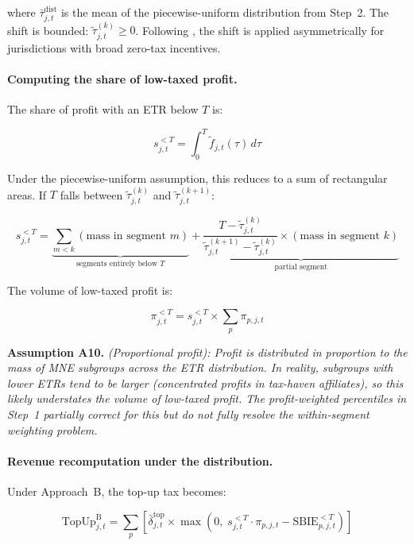 \documentclass[11pt,a4paper]{article}
\newcommand{\assumption}[2]{\noindent\textbf{Assumption #1.} \textit{#2}\medskip}
\begin{document}
where $\bar{\tau}_{j,t}^{\text{dist}}$ is the mean of the piecewise-uniform distribution from Step~2. The shift is bounded: $\tilde{\tau}_{j,t}^{(k)} \geq 0$. Following \citet{hugger2026}, the shift is applied asymmetrically for jurisdictions with broad zero-tax incentives.

\paragraph{Computing the share of low-taxed profit.}
The share of profit with an ETR below $T$ is:

\begin{equation}\label{eq:lowtax_share}
s_{j,t}^{<T} = \int_0^{T} \tilde{f}_{j,t}(\tau) \, d\tau
\end{equation}

Under the piecewise-uniform assumption, this reduces to a sum of rectangular areas. If $T$ falls between $\tilde{\tau}_{j,t}^{(k)}$ and $\tilde{\tau}_{j,t}^{(k+1)}$:

\begin{equation}\label{eq:lowtax_share_pw}
s_{j,t}^{<T} = \underbrace{\sum_{m < k} (\text{mass in segment } m)}_{\text{segments entirely below } T} + \underbrace{\frac{T - \tilde{\tau}_{j,t}^{(k)}}{\tilde{\tau}_{j,t}^{(k+1)} - \tilde{\tau}_{j,t}^{(k)}} \times (\text{mass in segment } k)}_{\text{partial segment}}
\end{equation}

The volume of low-taxed profit is:

\begin{equation}\label{eq:lowtax_profit}
\pi_{j,t}^{<T} = s_{j,t}^{<T} \times \sum_p \pi_{p,j,t}
\end{equation}

\assumption{A10}{(Proportional profit): Profit is distributed in proportion to the mass of MNE subgroups across the ETR distribution. In reality, subgroups with lower ETRs tend to be larger (concentrated profits in tax-haven affiliates), so this likely \emph{understates} the volume of low-taxed profit. The profit-weighted percentiles in Step~1 partially correct for this but do not fully resolve the within-segment weighting problem.}

\paragraph{Revenue recomputation under the distribution.}
Under Approach~B, the top-up tax becomes:

\begin{equation}\label{eq:topup_distrib}
\text{TopUp}_{j,t}^{\text{B}} = \sum_p \left[\bar{\delta}_{j,t}^{\text{top}} \times \max\!\left(0,\; s_{j,t}^{<T} \cdot \pi_{p,j,t} - \text{SBIE}_{p,j,t}^{<T}\right)\right]
\end{equation}
\end{document}

